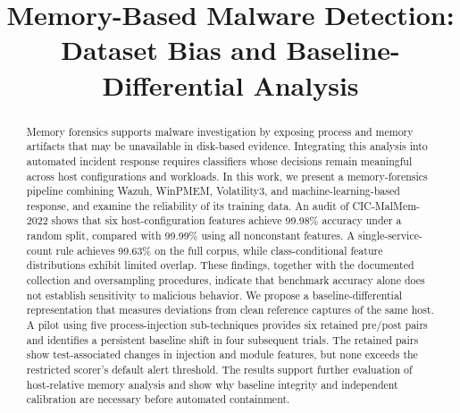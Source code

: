 \documentclass[conference]{IEEEtran}
\begin{document}
\title{Memory-Based Malware Detection:\\
Dataset Bias and Baseline-Differential Analysis}

\author{
\and
{}
\and
{}
}

\maketitle

\begin{abstract}
Memory forensics supports malware investigation by exposing process and memory
artifacts that may be unavailable in disk-based evidence. Integrating this
analysis into automated incident response requires classifiers whose decisions
remain meaningful across host configurations and workloads. In this work, we
present a memory-forensics pipeline combining Wazuh, WinPMEM, Volatility3, and
machine-learning-based response, and examine the reliability of its training
data. An audit of CIC-MalMem-2022 shows that six host-configuration features
achieve 99.98\% accuracy under a random split, compared with 99.99\% using all
nonconstant features. A single-service-count rule achieves 99.63\% on the full
corpus, while class-conditional feature distributions exhibit limited overlap.
These findings, together with the documented collection and oversampling
procedures, indicate that benchmark accuracy alone does not establish sensitivity
to malicious behavior. We propose a baseline-differential representation that
measures deviations from clean reference captures of the same host. A pilot
using five process-injection sub-techniques provides six retained pre/post pairs
and identifies a persistent baseline shift in four subsequent trials. The
retained pairs show test-associated changes in injection and module features,
but none exceeds the restricted scorer's default alert threshold. The results
support further evaluation of host-relative memory analysis and show why baseline
integrity and independent calibration are necessary before automated containment.
\end{abstract}
\end{document}
